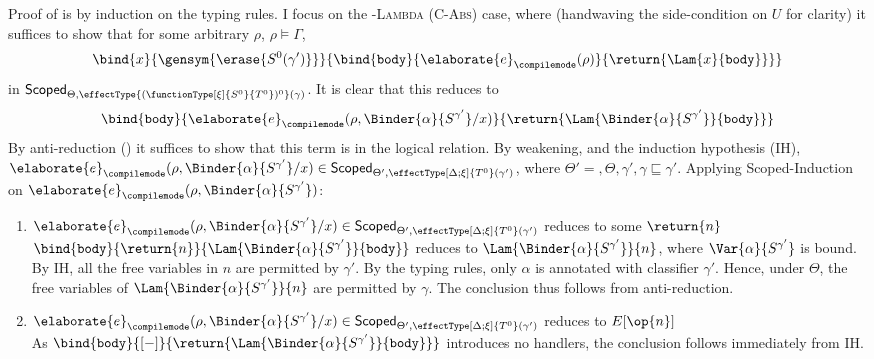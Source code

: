 Proof of  is by induction on the \recLang{} typing rules. I focus on the \textsc{\compilemode{}-Lambda} (\textsc{C-Abs}) case, where (handwaving the side-condition on $U$ for clarity) it suffices to show that for some arbitrary $\rho$, $\rho \vDash \Gamma$, 
\[\bind{x}{\gensym{\erase{S^0 (\gamma')}}}{\bind{\texttt{body}}{\elaborate{e}_{\compilemode}({\rho})}{\return{\Lam{x}{\texttt{body}}}}}\]
in $\scoped{\effectType{(\functionType[\xi]{S^0}{T^0})^0} (\gamma)}$. It is clear that this reduces to
\[{\bind{\texttt{body}}{\elaborate{e}_{\compilemode}({\rho, \Binder{\alpha}{S^{\gamma'}} / x})}{\return{\Lam{\Binder{\alpha}{S^{\gamma'}}}{\texttt{body}}}}}\]
 By anti-reduction () it suffices to show that this term is in the logical relation. By weakening, and the induction hypothesis (IH), $\elaborate{e}_{\compilemode}({\rho, \Binder{\alpha}{S^{\gamma'}} / x}) \in \scoped[\Theta']{\effectType[\Delta; \xi]{T^{0}} (\gamma')}$, where $\Theta' = , \Theta, \gamma', \gamma \sqsubseteq \gamma'$. Applying \textsf{Scoped}-Induction on $\elaborate{e}_{\compilemode}({\rho, \Binder{\alpha}{S^{\gamma'}}})$:
\begin{enumerate}
  \item $\elaborate{e}_{\compilemode}({\rho, \Binder{\alpha}{S^{\gamma'}} / x}) \in \scoped[\Theta']{\effectType[\Delta; \xi]{T^{0}} (\gamma')}$ reduces to some $\return{n}$\\
   $\bind{\texttt{body}}{\return{n}}{\Lam{\Binder{\alpha}{S^{\gamma'}}}{\texttt{body}}}$ reduces to $\Lam{\Binder{\alpha}{S^{\gamma'}}}{n}$, where $\Var{\alpha}{S^{\gamma'}}$ is bound. By IH, all the free variables in $n$ are permitted by $\gamma'$. By the typing rules, only $\alpha$ is annotated with classifier $\gamma'$. Hence, under $\Theta$, the free variables of $\Lam{\Binder{\alpha}{S^{\gamma'}}}{n}$ are permitted by $\gamma$. The conclusion thus follows from anti-reduction.
  \item $\elaborate{e}_{\compilemode}({\rho, \Binder{\alpha}{S^{\gamma'}} / x}) \in \scoped[\Theta']{\effectType[\Delta; \xi]{T^{0}} (\gamma')}$ reduces to $E[\op{n}]$ \\
  As $\bind{\texttt{body}}{[-]}{\return{\Lam{\Binder{\alpha}{S^{\gamma'}}}{\texttt{body}}}}$ introduces no handlers, the conclusion follows immediately from IH.
\end{enumerate}

